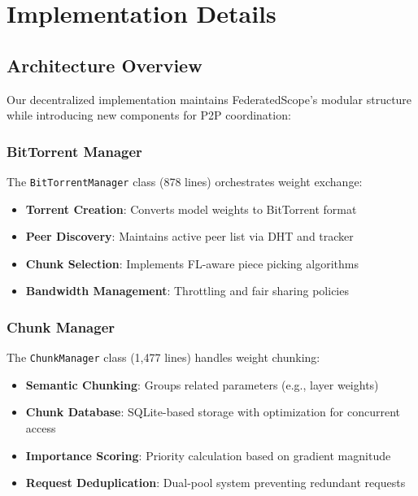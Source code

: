 \documentclass[11pt,conference]{article}
\begin{document}
\section{Implementation Details}

\subsection{Architecture Overview}

Our decentralized implementation maintains FederatedScope's modular structure while introducing new components for P2P coordination:

\subsubsection{BitTorrent Manager}
The \texttt{BitTorrentManager} class (878 lines) orchestrates weight exchange:
\begin{itemize}
    \item \textbf{Torrent Creation}: Converts model weights to BitTorrent format
    \item \textbf{Peer Discovery}: Maintains active peer list via DHT and tracker
    \item \textbf{Chunk Selection}: Implements FL-aware piece picking algorithms
    \item \textbf{Bandwidth Management}: Throttling and fair sharing policies
\end{itemize}

\subsubsection{Chunk Manager}
The \texttt{ChunkManager} class (1,477 lines) handles weight chunking:
\begin{itemize}
    \item \textbf{Semantic Chunking}: Groups related parameters (e.g., layer weights)
    \item \textbf{Chunk Database}: SQLite-based storage with optimization for concurrent access
    \item \textbf{Importance Scoring}: Priority calculation based on gradient magnitude
    \item \textbf{Request Deduplication}: Dual-pool system preventing redundant requests
\end{itemize}
\end{document}
